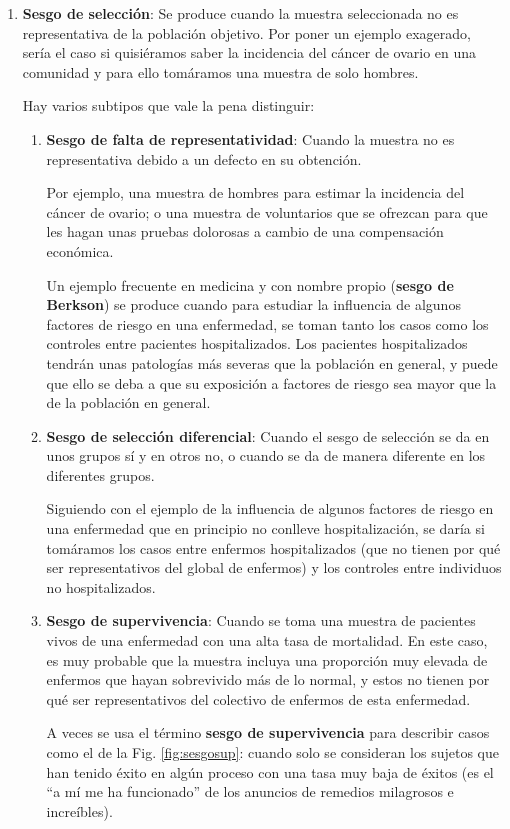 \documentclass[
]{book}
\theoremstyle{definition}
\theoremstyle{definition}
\theoremstyle{definition}
\theoremstyle{definition}
\theoremstyle{remark}
\begin{document}
\begin{enumerate}
\def\labelenumi{\arabic{enumi}.}
\item
  \textbf{Sesgo de selección}: Se produce cuando la muestra seleccionada no es representativa de la población objetivo. Por poner un ejemplo exagerado, sería el caso si quisiéramos saber la incidencia del cáncer de ovario en una comunidad y para ello tomáramos una muestra de solo hombres.

  Hay varios subtipos que vale la pena distinguir:

  \begin{enumerate}
  \def\labelenumii{\alph{enumii}.}
  \item
    \textbf{Sesgo de falta de representatividad}: Cuando la muestra no es representativa debido a un defecto en su obtención.

    Por ejemplo, una muestra de hombres para estimar la incidencia del cáncer de ovario; o una muestra de voluntarios que se ofrezcan para que les hagan unas pruebas dolorosas a cambio de una compensación económica.

    Un ejemplo frecuente en medicina y con nombre propio (\textbf{sesgo de Berkson}) se produce cuando para estudiar la influencia de algunos factores de riesgo en una enfermedad, se toman tanto los casos como los controles entre pacientes hospitalizados. Los pacientes hospitalizados tendrán unas patologías más severas que la población en general, y puede que ello se deba a que su exposición a factores de riesgo sea mayor que la de la población en general.
  \item
    \textbf{Sesgo de selección diferencial}: Cuando el sesgo de selección se da en unos grupos sí y en otros no, o cuando se da de manera diferente en los diferentes grupos.

    Siguiendo con el ejemplo de la influencia de algunos factores de riesgo en una enfermedad que en principio no conlleve hospitalización, se daría si tomáramos los casos entre enfermos hospitalizados (que no tienen por qué ser representativos del global de enfermos) y los controles entre individuos no hospitalizados.
  \item
    \textbf{Sesgo de supervivencia}: Cuando se toma una muestra de pacientes vivos de una enfermedad con una alta tasa de mortalidad. En este caso, es muy probable que la muestra incluya una proporción muy elevada de enfermos que hayan sobrevivido más de lo normal, y estos no tienen por qué ser representativos del colectivo de enfermos de esta enfermedad.

    A veces se usa el término \textbf{sesgo de supervivencia} para describir casos como el de la Fig. \ref{fig:sesgosup}: cuando solo se consideran los sujetos que han tenido éxito en algún proceso con una tasa muy baja de éxitos (es el ``a mí me ha funcionado'' de los anuncios de remedios milagrosos e increíbles).
  \end{enumerate}
\end{enumerate}
\end{document}
